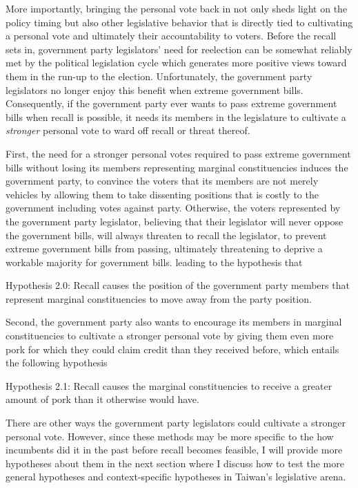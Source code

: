 \documentclass[hyphens, crop=false]{standalone}
\begin{document}
	More importantly,
	bringing the personal vote back in
	not only sheds light on the policy timing
	but also other legislative behavior
	that is directly tied to 
	cultivating a personal vote
	and ultimately their accountability to voters.
	Before the recall sets in,
	government party legislators' need for reelection
	can be somewhat reliably met by the
	political legislation cycle
	which generates more positive views toward them
	in the run-up to the election.
	Unfortunately,
	the government party legislators no longer enjoy this
	benefit when extreme government bills.
	Consequently,
	if the government party ever wants to pass extreme government bills
	when recall is possible,
	it needs its members in the legislature to
	cultivate a \textit{stronger} personal vote
	to ward off recall or threat thereof.
	
	First, the need for a stronger personal votes
	required to pass extreme government bills
	without losing its members representing marginal constituencies
	induces the government party,
	to convince the voters that its members 
	are not merely vehicles
	by allowing them to take dissenting positions
	that is costly to the government
	including votes against party.
	Otherwise,
	the voters represented by the government party legislator,
	believing that their legislator will never oppose the government bills,
	will always threaten to recall the legislator,
	to prevent extreme government bills from passing,
	ultimately threatening to deprive a workable majority for government bills.
	leading to the hypothesis that
	
	Hypothesis 2.0:
	Recall causes
	the position of the government party members
	that represent marginal constituencies to move away from the party position. 
	
	
	Second,
	the government party also wants to encourage
	its members in marginal constituencies to cultivate a stronger personal vote
	by giving them even more pork for which they could claim credit than they received before,
	which entails the following hypothesis
	
	Hypothesis 2.1:
	Recall causes
	the marginal constituencies to receive a greater amount of pork
	than it otherwise would have.
	
	There are other ways the government party legislators
	could cultivate a stronger personal vote.
	However, since these methods may be more specific
	to the how incumbents did it in the past
	before recall becomes feasible,
	I will provide more hypotheses about them in the next section
	where I discuss how to test the more general hypotheses
	and context-specific hypotheses in Taiwan's legislative arena.
	
\end{document}
